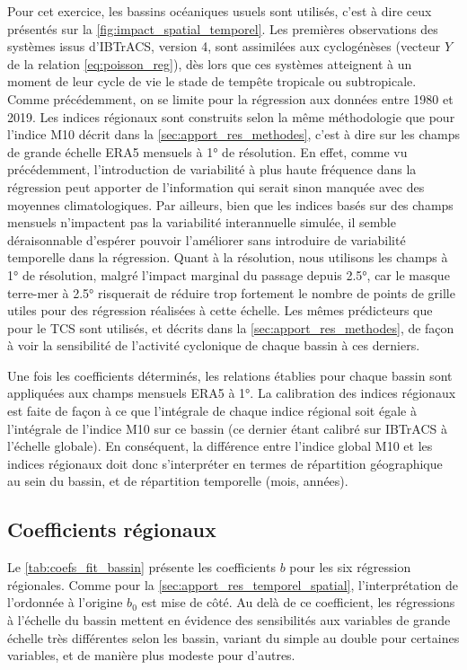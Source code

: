 \documentclass[../main.tex]{subfiles}
\begin{document}
Pour cet exercice, les bassins océaniques usuels sont utilisés, c'est à dire ceux présentés sur la \cref{fig:impact_spatial_temporel}. Les premières
observations des systèmes issus d'IBTrACS, version 4, sont assimilées aux cyclogénèses (vecteur $Y$ de la relation \ref{eq:poisson_reg}), dès lors que ces
systèmes atteignent à un moment de leur cycle de vie le stade de tempête tropicale ou subtropicale. Comme précédemment, on se limite pour la régression aux
données entre \num{1980} et \num{2019}. Les indices régionaux sont construits selon la même méthodologie que pour l'indice M10 décrit dans la
\cref{sec:apport_res_methodes}, c'est à dire sur les champs de grande échelle ERA5 mensuels à \ang{1} de résolution. En effet, comme vu précédemment,
l'introduction de variabilité à plus haute fréquence dans la régression peut apporter de l'information qui serait sinon manquée avec des moyennes
climatologiques. Par ailleurs, bien que les indices basés sur des champs mensuels n'impactent pas la variabilité interannuelle simulée, il semble déraisonnable
d'espérer pouvoir l'améliorer sans introduire de variabilité temporelle dans la régression. Quant à la résolution, nous utilisons les champs à \ang{1} de
résolution, malgré l'impact marginal du passage depuis \ang{2.5}, car le masque terre-mer à \ang{2.5} risquerait de réduire trop fortement le nombre de points
de grille utiles pour des régression réalisées à cette échelle. Les mêmes prédicteurs que pour le TCS sont utilisés, et décrits dans la
\cref{sec:apport_res_methodes}, de façon à voir la sensibilité de l'activité cyclonique de chaque bassin à ces derniers.

Une fois les coefficients déterminés, les relations établies pour chaque bassin sont appliquées aux champs mensuels ERA5 à \ang{1}. La calibration des indices
régionaux est faite de façon à ce que l'intégrale de chaque indice régional soit égale à l'intégrale de l'indice M10 sur ce bassin (ce dernier étant calibré sur
IBTrACS à l'échelle globale). En conséquent, la différence entre l'indice global M10 et les indices régionaux doit donc s'interpréter en termes de répartition
géographique au sein du bassin, et de répartition temporelle (mois, années).

\subsection{Coefficients régionaux}\label{sec:lm10_coefficients}

Le \cref{tab:coefs_fit_bassin} présente les coefficients $b$ pour les six régression régionales. Comme pour la \cref{sec:apport_res_temporel_spatial},
l'interprétation de l'ordonnée à l'origine $b_0$ est mise de côté. Au delà de ce coefficient, les régressions à l'échelle du bassin mettent en évidence des
sensibilités aux variables de grande échelle très différentes selon les bassin, variant du simple au double pour certaines variables, et de manière plus modeste
pour d'autres.
\end{document}
